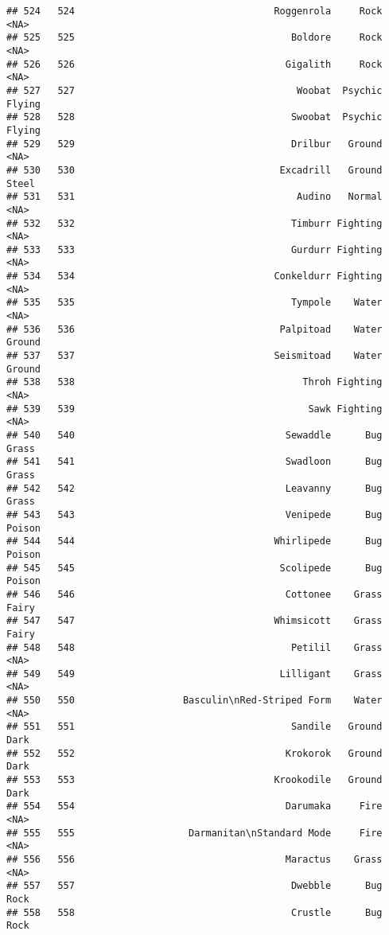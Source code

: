 \documentclass[
]{article}
\begin{document}
\begin{verbatim}
## 524   524                                   Roggenrola     Rock     <NA>
## 525   525                                      Boldore     Rock     <NA>
## 526   526                                     Gigalith     Rock     <NA>
## 527   527                                       Woobat  Psychic   Flying
## 528   528                                      Swoobat  Psychic   Flying
## 529   529                                      Drilbur   Ground     <NA>
## 530   530                                    Excadrill   Ground    Steel
## 531   531                                       Audino   Normal     <NA>
## 532   532                                      Timburr Fighting     <NA>
## 533   533                                      Gurdurr Fighting     <NA>
## 534   534                                   Conkeldurr Fighting     <NA>
## 535   535                                      Tympole    Water     <NA>
## 536   536                                    Palpitoad    Water   Ground
## 537   537                                   Seismitoad    Water   Ground
## 538   538                                        Throh Fighting     <NA>
## 539   539                                         Sawk Fighting     <NA>
## 540   540                                     Sewaddle      Bug    Grass
## 541   541                                     Swadloon      Bug    Grass
## 542   542                                     Leavanny      Bug    Grass
## 543   543                                     Venipede      Bug   Poison
## 544   544                                   Whirlipede      Bug   Poison
## 545   545                                    Scolipede      Bug   Poison
## 546   546                                     Cottonee    Grass    Fairy
## 547   547                                   Whimsicott    Grass    Fairy
## 548   548                                      Petilil    Grass     <NA>
## 549   549                                    Lilligant    Grass     <NA>
## 550   550                   Basculin\nRed-Striped Form    Water     <NA>
## 551   551                                      Sandile   Ground     Dark
## 552   552                                     Krokorok   Ground     Dark
## 553   553                                   Krookodile   Ground     Dark
## 554   554                                     Darumaka     Fire     <NA>
## 555   555                    Darmanitan\nStandard Mode     Fire     <NA>
## 556   556                                     Maractus    Grass     <NA>
## 557   557                                      Dwebble      Bug     Rock
## 558   558                                      Crustle      Bug     Rock

\end{verbatim}
\end{document}
